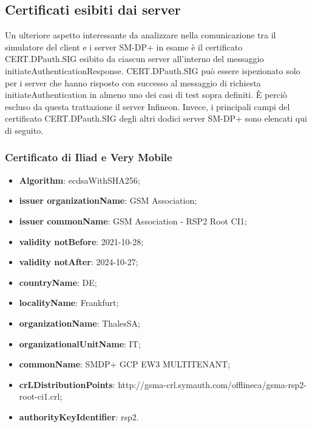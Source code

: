 \documentclass[10pt, oneside]{book}
\begin{document}
\subsection{Certificati esibiti dai server}
Un ulteriore aspetto interessante da analizzare nella comunicazione tra il simulatore del client e i server SM-DP+ in esame è il certificato CERT.DPauth.SIG esibito da ciascun server all'interno del messaggio initiateAuthenticationResponse. CERT.DPauth.SIG può essere ispezionato solo per i server che hanno risposto con successo al messaggio di richiesta initiateAuthentication in almeno uno dei casi di test sopra definiti. È perciò escluso da questa trattazione il server Infineon. Invece, i principali campi del certificato CERT.DPauth.SIG degli altri dodici server SM-DP+ sono elencati qui di seguito.

\subsubsection{Certificato di Iliad e Very Mobile}
\begin{itemize}
\item \textbf{Algorithm}: ecdsaWithSHA256;
\item \textbf{issuer organizationName}: GSM Association;
\item \textbf{issuer commonName}: GSM Association - RSP2 Root CI1;
\item \textbf{validity notBefore}: 2021-10-28;
\item \textbf{validity notAfter}: 2024-10-27;
\item \textbf{countryName}: DE;
\item \textbf{localityName}: Frankfurt;
\item \textbf{organizationName}: ThalesSA;
\item \textbf{organizationalUnitName}: IT;
\item \textbf{commonName}: SMDP+ GCP EW3 MULTITENANT;
\item \textbf{crLDistributionPoints}: http://gsma-crl.symauth.com/offlineca/gsma-rsp2-root-ci1.crl;
\item \textbf{authorityKeyIdentifier}: rsp2.
\end{itemize}
\end{document}
